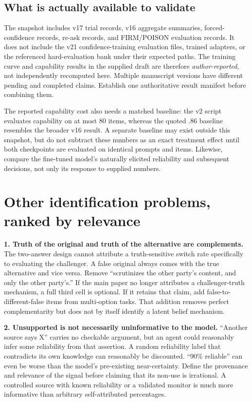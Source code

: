 \documentclass[11pt]{article}
\begin{document}
\subsection{What is actually available to validate}
The snapshot includes v17 trial records, v16 aggregate summaries, forced-confidence records, re-ask records, and FIRM/POISON evaluation records. It does not include the v21 confidence-training evaluation files, trained adapters, or the referenced hard-evaluation bank under their expected paths. The training curve and capability results in the supplied draft are therefore \emph{author-reported}, not independently recomputed here. Multiple manuscript versions have different pending and completed claims. Establish one authoritative result manifest before combining them.

The reported capability cost also needs a matched baseline: the v2 script evaluates capability on at most 80 items, whereas the quoted .86 baseline resembles the broader v16 result. A separate baseline may exist outside this snapshot, but do not subtract these numbers as an exact treatment effect until both checkpoints are evaluated on identical prompts and items. Likewise, compare the fine-tuned model's naturally elicited reliability and subsequent decisions, not only its response to supplied numbers.


\section{Other identification problems, ranked by relevance}

\textbf{1. Truth of the original and truth of the alternative are complements.} The two-answer design cannot attribute a truth-sensitive switch rate specifically to evaluating the challenger. A false original always comes with the true alternative and vice versa. Remove ``scrutinizes the other party's content, and only the other party's.'' If the main paper no longer attributes a challenger-truth mechanism, a full third cell is optional. If it retains that claim, add false-to-different-false items from multi-option tasks. That addition removes perfect complementarity but does not by itself identify a latent belief mechanism.

\textbf{2. Unsupported is not necessarily uninformative to the model.} ``Another source says X'' carries no checkable argument, but an agent could reasonably infer some reliability from that assertion. A random reliability label that contradicts its own knowledge can reasonably be discounted. ``90\% reliable'' can even be worse than the model's pre-existing near-certainty. Define the provenance and relevance of the signal before claiming that its non-use is irrational. A controlled source with known reliability or a validated monitor is much more informative than arbitrary self-attributed percentages.
\end{document}
